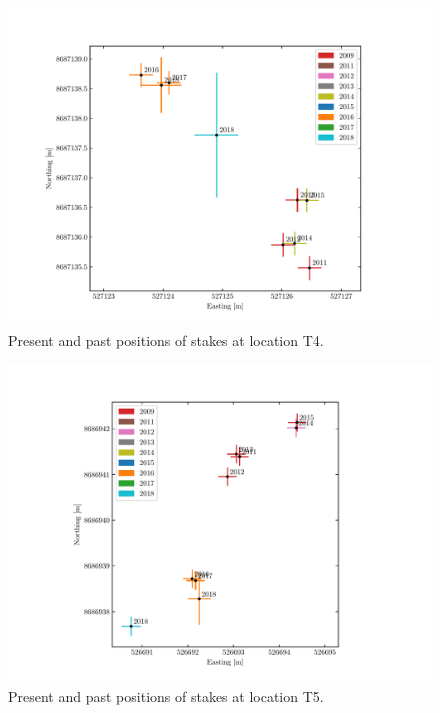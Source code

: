 \begin{figure}[H]
    \centering
    \includegraphics[width=.9\textwidth]{./figs/T4_2d.pdf}
    \caption{Present and past positions of stakes at location T4.}
    \label{GPS:fig:T4_2d}
\end{figure}

\begin{figure}[H]
    \centering
    \includegraphics[width=.9\textwidth]{./figs/T5_2d.pdf}
    \caption{Present and past positions of stakes at location T5.}
    \label{GPS:fig:T5_2d}
\end{figure}

